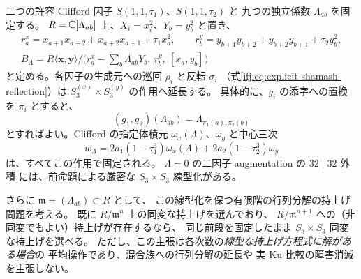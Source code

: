 \begin{lemma}
\label{ifj:lem:mixed-clifford-s3-family}
二つの許容 Clifford 因子 $S(1,1,\tau_1)$、$S(1,1,\tau_2)$ と
九つの独立係数 $\Lambda_{ab}$ を固定する。
$R=\mathbb C[\Lambda_{ab}]$ 上、$X_i=x_i^2$、$Y_b=y_b^2$ と置き、
\[
 \begin{gathered}
 r^x_a=x_{a+1}x_{a+2}+x_{a+2}x_{a+1}+\tau_1x_a^2,
 \qquad r^y_b=y_{b+1}y_{b+2}+y_{b+2}y_{b+1}+\tau_2y_b^2,\\
 B_\Lambda=R\langle\mathbf x,\mathbf y\rangle
 \big/\bigl(r^x_a-\sum_b\Lambda_{ab}Y_b,\ r^y_b,\ [x_a,y_b]\bigr)
 \end{gathered}
\]
と定める。各因子の生成元への巡回 $\rho_i$ と反転 $\sigma_i$
（式\eqref{ifj:eq:explicit-shamash-reflection}）は
$S_3^{(x)}\times S_3^{(y)}$ の作用へ延長する。
具体的に、$g_i$ の添字への置換を $\pi_i$ とすると、
\begin{equation}\label{ifj:eq:mixed-clifford-s3-parameters}
 (g_1,g_2)(\Lambda_{ab})
       =\Lambda_{\pi_1(a),\pi_2(b)}
\end{equation}
とすればよい。Clifford の指定体積元
$\omega_x(\Lambda)$、$\omega_y$ と中心三次
\[
 w_\Lambda=2a_1(1-\tau_1^3)\omega_x(\Lambda)
              +2a_2(1-\tau_2^3)\omega_y
\]
は、すべてこの作用で固定される。
$\Lambda=0$ の二因子 augmentation の $32\mid32$ 外積
には、前命題による厳密な $S_3\times S_3$ 線型化がある。

さらに $\mathfrak m=(\Lambda_{ab})\subset R$ として、
この線型化を保つ有限階の行列分解の持上げ問題を考える。
既に $R/\mathfrak m^n$ 上の同変な持上げを選んでおり、
$R/\mathfrak m^{n+1}$ への（非同変でもよい）持上げが存在するなら、
同じ前段を固定したまま $S_3\times S_3$ 同変な持上げを選べる。
ただし、この主張は各次数の\emph{線型な持上げ方程式に解がある場合}の
平均操作であり、混合族への行列分解の延長や
実 Ku 比較の障害消滅を主張しない。
\end{lemma}

